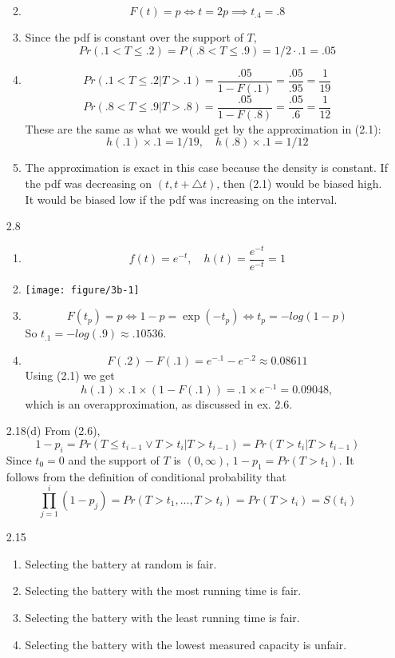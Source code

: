\documentclass[12pt]{article}\usepackage[]{graphicx}\usepackage[]{color}
\newenvironment{knitrout}{}{} %
\begin{document}
\begin{enumerate}
\begin{enumerate}
\begin{knitrout}
\end{knitrout}
 \item
 \[F(t)=p \iff t=2p \implies t_{.4}=.8\]
 \item
 Since the pdf is constant over the support of $T$,
 \[Pr(.1<T\le.2) = P(.8<T\le.9) = 1/2 \cdot .1 = .05\]
 \item
 \[Pr(.1<T\le.2|T>.1) = \frac{.05}{1-F(.1)}=\frac{.05}{.95} = \frac{1}{19}\]
  \[Pr(.8<T\le.9|T>.8) = \frac{.05}{1-F(.8)}=\frac{.05}{.6} = \frac{1}{12}\]
  These are the same as what we would get by the approximation in (2.1):
  \[h(.1)\times.1 = 1/19,\quad h(.8)\times.1 = 1/12\]
 \item
 The approximation is exact in this case because the density is constant. If the pdf was decreasing on $(t,t+\triangle t)$, then (2.1) would be biased high. It would be biased low if the pdf was increasing on the interval.
\end{enumerate}

\item[2.8]
\begin{enumerate}
  \item
  \[f(t) = e^{-t},\quad h(t) = \frac{e^{-t}}{e^{-t}}=1\]
  \item
\begin{knitrout}
\color{fgcolor}
\texttt{[image: figure/3b-1]} 

\end{knitrout}
  \item
  \[F(t_p) = p \iff 1-p = \exp(-t_p) \iff t_p = -log(1-p)\]
  So $t_{.1} = -log(.9) \approx .10536$.
  \item
  \[F(.2)-F(.1) = e^{-.1}-e^{-.2} \approx 0.08611 \]
  Using (2.1) we get
  \[h(.1)\times .1 \times (1-F(.1)) = .1 \times e^{-.1} = 0.09048,\]
  which is an overapproximation, as discussed in ex. 2.6.
\end{enumerate}

\item[2.18(d)]
From (2.6),
\[1-p_i = Pr(T\le t_{i-1} \lor T > t_i | T>t_{i-1}) = Pr(T>t_i|T>t_{i-1})\]
Since $t_0=0$ and the support of $T$ is $(0,\infty)$, $1 - p_1 = Pr(T>t_1)$. It follows from the definition of conditional probability that
\[\prod_{j=1}^{i}(1-p_j) = Pr(T>t_1,...,T>t_i) = Pr(T>t_i) = S(t_i)\]

\item[2.15]
\begin{enumerate}
  \item Selecting the battery at random is fair.
  \item Selecting the battery with the most running time is fair.
  \item Selecting the battery with the least running time is fair.
  \item Selecting the battery with the lowest measured capacity is unfair.
  

\end{enumerate}
\end{enumerate}
\end{document}
